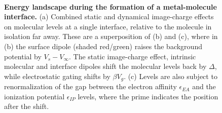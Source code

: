 \documentclass[aip,jcp,a4paper,reprint,floatfix,superscriptaddress]{revtex4-1}
\begin{document}
\begin{figure}
\\
\caption{\textbf{Energy landscape during the formation of a metal-molecule interface.} 
(a) Combined static and dynamical image-charge effects on molecular levels at a single interface, relative to the molecule in isolation far away. These are a superposition of (b) and (c), where in (b) the surface dipole (shaded red/green) raises the background potential by $V_s-V_\infty$. The static image-charge effect, intrinsic molecular and interface dipoles shift the molecular levels back by $\Delta$, while electrostatic gating shifts by $\beta V_g$. (c) Levels are also subject to renormalization of the gap between the electron affinity $\epsilon_{EA}$ and the ionization potential $\epsilon_{IP}$ levels, where the prime indicates the position after the shift. 
}\label{fg:landscape}
\end{figure}
\end{document}
